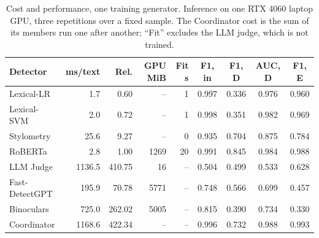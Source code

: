 \begin{table}[t]
\centering
\footnotesize
\caption{Cost and performance, one training generator. Inference on one RTX 4060 laptop GPU, three repetitions over a fixed sample. The Coordinator cost is the sum of its members run one after another; ``Fit'' excludes the LLM judge, which is not trained.}
\label{tab:cost}
\begin{tabular}{lrrrrcccc}
\toprule
Detector & ms/text & Rel. & GPU MiB & Fit s & F1, in & F1, D & AUC, D & F1, E \\
\midrule
Lexical-LR & 1.7 & 0.60 & -- & 1 & 0.997 & 0.336 & 0.976 & 0.960 \\
Lexical-SVM & 2.0 & 0.72 & -- & 1 & 0.998 & 0.351 & 0.982 & 0.969 \\
Stylometry & 25.6 & 9.27 & -- & 0 & 0.935 & 0.704 & 0.875 & 0.784 \\
RoBERTa & 2.8 & 1.00 & 1269 & 20 & 0.991 & 0.845 & 0.984 & 0.988 \\
LLM Judge & 1136.5 & 410.75 & 16 & -- & 0.504 & 0.499 & 0.533 & 0.628 \\
Fast-DetectGPT & 195.9 & 70.78 & 5771 & -- & 0.748 & 0.566 & 0.699 & 0.457 \\
Binoculars & 725.0 & 262.02 & 5005 & -- & 0.815 & 0.390 & 0.734 & 0.330 \\
Coordinator & 1168.6 & 422.34 & -- & -- & 0.996 & 0.732 & 0.988 & 0.993 \\
\bottomrule
\end{tabular}
\end{table}
